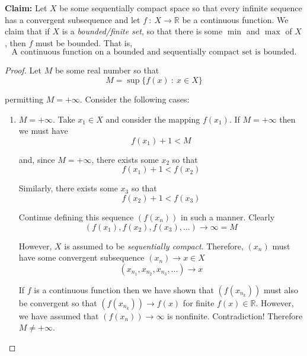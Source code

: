 \documentclass[12pt]{article}
\newlength\tindent
\renewcommand{\indent}{\hspace*{\tindent}}
\newcommand{\R}{\mathbb R}
\begin{document}
%
%
{\bf Claim:} Let $X$ be some sequentially compact space so that every infinite sequence has a convergent subsequence and let $f~:~X\to\R$ be a continuous function. We claim that if $X$ is a {\em bounded/finite set}, so that there is some $\min$ and $\max$ of $X$, then $f$ must be bounded. That is,
\begin{equation*}
	\text{A continuous function on a bounded and sequentially compact set is bounded.}
\end{equation*}

\begin{proof} Let $M$ be some real number so that
\begin{equation*}
	M = \sup \{f(x) ~:~ x\in X\}
\end{equation*}

permitting $M = +\infty$. Consider the following cases:
\begin{enumerate}[{Case} 1:]
	\item $M = +\infty$. Take $x_1 \in X$ and consider the mapping $f(x_1)$. If $M = +\infty$ then we must have
	\begin{equation*}
		f(x_1) + 1 < M
	\end{equation*}
	
	and, since $M = +\infty$, there exists some $x_2$ so that
	\begin{equation*}
		f(x_1) + 1 < f(x_2)
	\end{equation*}
	
	Similarly, there exists some $x_3$ so that
	\begin{equation*}
		f(x_2) + 1 < f(x_3)
	\end{equation*}	
	
	Continue defining this sequence $(f(x_n))$ in such a manner. Clearly
	\begin{equation*}
		\left( f(x_1), f(x_2), f(x_3), ...\right) \longrightarrow \infty = M
	\end{equation*}
	
	\indent However, $X$ is assumed to be {\em sequentially compact}. Therefore, $(x_n)$ must have some convergent subsequence $(x_n)\longrightarrow x \in X$
	\begin{equation*}
		(x_{n_1}, x_{n_2}, x_{n_3}, ...) \longrightarrow x
	\end{equation*}
	
	\indent If $f$ is a continuous function then we have shown that $(f(x_{n_k}))$ must also be convergent so that $(f(x_{n_k}))\to f(x)$ for finite $f(x) \in \R$. However, we have assumed that $(f(x_n))\longrightarrow \infty$ is nonfinite. Contradiction! Therefore $M \neq +\infty$.
	

\end{enumerate}
\end{proof}
\end{document}
